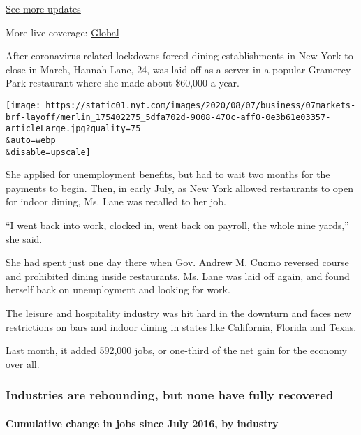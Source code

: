\href{https://www.nytimes.com/live/2020/08/07/business/stock-market-today-coronavirus?action=click\&pgtype=Article\&state=default\&region=MAIN_CONTENT_1\&context=storylines_live_updates}{See
more updates}

More live coverage:
\href{https://www.nytimes.com/2020/08/07/world/covid-19-news.html?action=click\&pgtype=Article\&state=default\&region=MAIN_CONTENT_1\&context=storylines_live_updates}{Global}

After coronavirus-related lockdowns forced dining establishments in New
York to close in March, Hannah Lane, 24, was laid off as a server in a
popular Gramercy Park restaurant where she made about \$60,000 a year.

\texttt{[image: https://static01.nyt.com/images/2020/08/07/business/07markets-brf-layoff/merlin\_175402275\_5dfa702d-9008-470c-aff0-0e3b61e03357-articleLarge.jpg?quality=75\\\&auto=webp\\\&disable=upscale]}

She applied for unemployment benefits, but had to wait two months for
the payments to begin. Then, in early July, as New York allowed
restaurants to open for indoor dining, Ms. Lane was recalled to her job.

``I went back into work, clocked in, went back on payroll, the whole
nine yards,'' she said.

She had spent just one day there when Gov. Andrew M. Cuomo reversed
course and prohibited dining inside restaurants. Ms. Lane was laid off
again, and found herself back on unemployment and looking for work.

The leisure and hospitality industry was hit hard in the downturn and
faces new restrictions on bars and indoor dining in states like
California, Florida and Texas.

Last month, it added 592,000 jobs, or one-third of the net gain for the
economy over all.

\hypertarget{industries-are-rebounding-but-none-have-fully-recovered}{%
\subsubsection{Industries are rebounding, but none have fully
recovered}\label{industries-are-rebounding-but-none-have-fully-recovered}}

\hypertarget{cumulative-change-in-jobs-since-july-2016-by-industry}{%
\paragraph{Cumulative change in jobs since July 2016, by
industry}\label{cumulative-change-in-jobs-since-july-2016-by-industry}}

